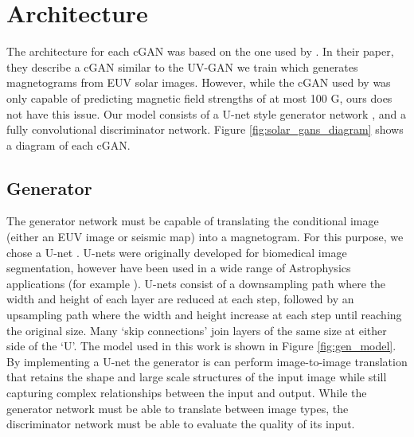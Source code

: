 \documentclass[11pt,a4paper,onecolumn]{report}
\begin{document}
%
%
%
%
%
\section{Architecture}
%
%
%
%
%
%

The architecture for each cGAN was based on the one used by \citet{Kim2019}. In
their paper, they describe a cGAN similar to the UV-GAN we train which generates
magnetograms from EUV solar images. However, while the cGAN used by
\citet{Kim2019} was only capable of predicting magnetic field strengths of at
most 100 G, ours does not have this issue. Our model consists of a U-net style generator network
\citep{ronneberger_u-net_2015}, and a fully convolutional discriminator network. Figure
\ref{fig:solar_gans_diagram} shows a diagram of each cGAN.


\subsection{Generator}
The generator network must be capable of translating the conditional image
(either an EUV image or seismic map) into a magnetogram. For this purpose, we
chose a U-net \citep{ronneberger_u-net_2015}. U-nets were originally developed
for biomedical image segmentation, however have been used in a wide range of
Astrophysics applications (for example
\citet{felipe_improved_2019,bekki_quantifying_2021,baso_solar_2019}). U-nets
consist of a downsampling path where the width and height of each layer are
reduced at each step, followed by an upsampling path where the width and height
increase at each step until reaching the original size. Many `skip
connections' join layers of the same size at either side of the `U'. The model used
in this work is shown in Figure \ref{fig:gen_model}. By implementing a U-net the
generator is can perform image-to-image translation that retains the shape and
large scale structures of the input image while still capturing complex
relationships between the input and output. While the generator network must be
able to translate between image types, the discriminator network must be able to
evaluate the quality of its input.
\end{document}
